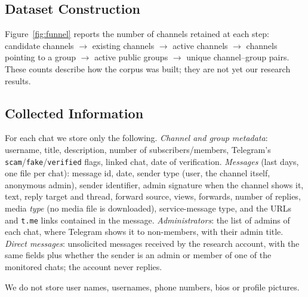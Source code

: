 \subsection{Dataset Construction}
\label{subsec:dataset-construction}

Figure~\ref{fig:funnel}  reports the number of channels
retained at each step:
candidate channels $\rightarrow$ existing channels $\rightarrow$ active
channels $\rightarrow$ channels pointing to a group $\rightarrow$ active public
groups $\rightarrow$ unique channel--group pairs.
These counts describe how the corpus was built; they are not yet our research
results.

\subsection{Collected Information}
\label{subsec:collected-information}

For each chat we store only the following.
\emph{Channel and group metadata}: username, title, description, number of
subscribers/members, Telegram's \texttt{scam}/\texttt{fake}/\texttt{verified}
flags, linked chat, date of verification.
\emph{Messages} (last  days, one file per chat): message id, date,
sender type (user, the channel itself, anonymous admin), sender identifier,
admin signature when the channel shows it, text, reply target and thread,
forward source, views, forwards, number of replies, media \emph{type} (no media
file is downloaded), service-message type, and the URLs and \texttt{t.me} links
contained in the message.
\emph{Administrators}: the list of admins of each chat, where Telegram shows it
to non-members, with their admin title.
\emph{Direct messages}: unsolicited messages received by the research account,
with the same fields plus whether the sender is an admin or member of one of
the monitored chats; the account never replies.

We do not store user names, usernames, phone numbers, bios or profile
pictures. 
